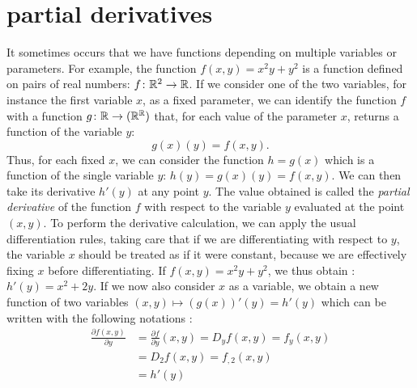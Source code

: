 \section{partial derivatives}

It sometimes occurs that we have functions depending on multiple variables or
parameters. For example, the function $f(x,y) = x^2y+y^2$ is a function defined
on pairs of real numbers: $f\colon {\mathbb R}^2\to {\mathbb R}$. If we consider one of the two
variables, for instance the first variable $x$, as a fixed parameter, we can
identify the function $f$ with a function $g\colon {\mathbb R} \to ({\mathbb R}^{\mathbb R})$ that, for
each value of the parameter $x$, returns a function of the variable $y$:
\[
  g(x)(y) = f(x,y).
\]
Thus, for each fixed $x$, we can consider the function $h=g(x)$ which is a
function of the single variable $y$: $h(y) = g(x)(y) = f(x,y)$. We can then take
its derivative $h'(y)$ at any point $y$. The value obtained is called the
\emph{partial derivative}%
%
of the function $f$ with respect to the variable $y$ evaluated at the point
$(x,y)$. To perform the derivative calculation, we can apply the usual
differentiation rules, taking care that if we are differentiating with respect
to $y$, the variable $x$ should be treated as if it were constant, because we
are effectively fixing $x$ before differentiating. If $f(x,y) = x^2y+y^2$, we
thus obtain%
:
$h'(y) = x^2 + 2y$.
If we now also consider $x$ as a variable, we obtain a new function of two
variables $(x,y)\mapsto (g(x))'(y) = h'(y)$ which can be written with the
following notations%
:
\begin{align*}
\frac{\partial f(x,y)}{\partial y} 
&= \frac{\partial f}{\partial y}(x,y)
= D_y f(x,y)
= f_y (x,y) \\
&= D_2 f(x,y) = f_{,2} (x,y) \\
&= h'(y)
\end{align*}

